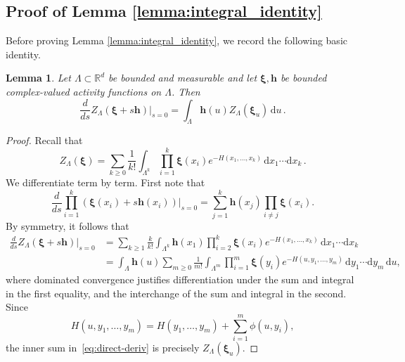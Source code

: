 \documentclass[10pt]{amsart}
\newtheorem{lemma}[theorem]{Lemma}
\theoremstyle{definition}
\theoremstyle{remark}
\newcommand{\R}{\mathbb{R}}
\newcommand{\region}{\Lambda}
\newcommand{\potential}{\phi}
\newcommand{\diff}{\mathrm{d}}
\begin{document}
	\subsection{Proof of Lemma \texorpdfstring{\ref{lemma:integral_identity}}{5.4}} \label{sec:integral-identity-proof}
	Before proving Lemma \ref{lemma:integral_identity}, we record the following basic identity.
	\begin{lemma}
		\label{lem:log-derivative-F}
		Let \(\region\subset\R^d\) be bounded and measurable and let $\pmb{\xi}, \pmb{h}$ be bounded complex-valued activity functions on $\Lambda$. Then
		\[
		\frac{d}{ds}Z_\region(\pmb{\xi}+s\pmb{h})\bigg|_{s=0}
		=
		\int_\region \pmb{h}(u)Z_\region(\pmb{\xi}_u)\,\diff u\, . 
		\]
	\end{lemma}
	\begin{proof}
		Recall that
		\[
		Z_\region(\pmb{\xi})
		=
		\sum_{k\ge0}\frac1{k!}
		\int_{\region^k}
		\prod_{i=1}^k \pmb{\xi}(x_i)
		e^{-H(x_1,\ldots,x_k)}
		\,\diff x_1\cdots \diff x_k\, .
		\]
		We differentiate term by term. First note that
		\[
		\frac{d}{ds}
		\prod_{i=1}^k(\pmb{\xi}(x_i)+s\pmb{h}(x_i))
		\bigg|_{s=0}
		=
		\sum_{j=1}^k
		\pmb{h}(x_j)\prod_{i\ne j}\pmb{\xi}(x_i).
		\]
		By symmetry, it follows that
		\begin{align}
			\frac{d}{ds}Z_\region(\pmb{\xi}+s\pmb{h})\bigg|_{s=0}
			&=
			\sum_{k\ge1}\frac{k}{k!}
			\int_{\region^k}
			\pmb{h}(x_1)
			\prod_{i=2}^k \pmb{\xi}(x_i)
			e^{-H(x_1,\ldots,x_k)}
			\,\diff x_1\cdots \diff x_k \nonumber \\
			&=
			\int_\region \pmb{h}(u)
			\sum_{m\ge0}\frac1{m!}
			\int_{\region^m}
			\prod_{i=1}^m \pmb{\xi}(y_i)
			e^{-H(u,y_1,\ldots,y_m)}
			\,\diff y_1\cdots \diff y_m
			\,\diff u , \label{eq:direct-deriv}
		\end{align}
		where dominated convergence justifies differentiation under the sum and integral in the first equality, and the interchange of the sum and integral in the second. 
		Since
		\[
		H(u,y_1,\ldots,y_m)
		=
		H(y_1,\ldots,y_m)
		+
		\sum_{i=1}^m \potential(u,y_i),
		\]
		the inner sum in~\eqref{eq:direct-deriv} is precisely $Z_\region(\pmb{\xi}_u)$.
	\end{proof}
	
	
	
\end{document}
